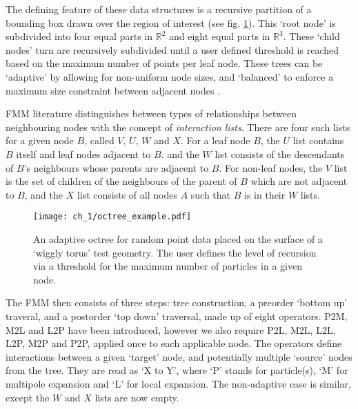 The defining feature of these data structures is a recursive partition of a bounding box drawn over the region of interest (see fig. \ref{fig:octree_example:sec_1_2}). This ‘root node’ is subdivided into four equal parts in $\mathbb{R}^2$ and eight equal parts in $\mathbb{R}^3$. These ‘child nodes’ turn are recursively subdivided until a user defined threshold is reached based on the maximum number of points per leaf node. These trees can be `adaptive' by allowing for non-uniform node sizes, and `balanced' to enforce a maximum size constraint between adjacent nodes \cite{sundar2008bottom}.

\gls{FMM} literature distinguishes between types of relationships  between neighbouring nodes with the concept of \textit{interaction lists}. There are four such lists for a given node $B$, called $V$, $U$, $W$ and $X$. For a leaf node $B$, the $U$ list contains $B$ itself and leaf nodes adjacent to $B$. and the $W$ list consists of the descendants of $B$'s neighbours whose parents are adjacent to $B$. For non-leaf nodes, the $V$ list is the set of children of the neighbours of the parent of $B$ which are not adjacent to $B$, and the $X$ list consists of all nodes $A$ such that $B$ is in their $W$ lists. 

\begin{figure}
    \centering
    \texttt{[image: ch\_1/octree\_example.pdf]}
    \caption{An adaptive octree for random point data placed on the surface of a `wiggly torus' test geometry. The user defines the level of recursion via a threshold for the maximum number of particles in a given node.}
    \label{fig:octree_example:sec_1_2}
\end{figure}


The FMM then consists of three steps: tree construction, a preorder `bottom up' traveral, and a postorder `top down' traversal, made up of eight operators. P2M, M2L and L2P have been introduced, however we also require P2L, M2L, L2L, L2P, M2P and P2P, applied once to each applicable node. The operators define interactions between a given ‘target’ node, and potentially multiple ‘source’ nodes from the tree. They are read as ‘X to Y’, where ‘P’ stands for particle(s), ‘M’ for multipole expansion and ‘L’ for local expansion. The non-adaptive case is similar, except the $W$ and $X$ lists are now empty.

